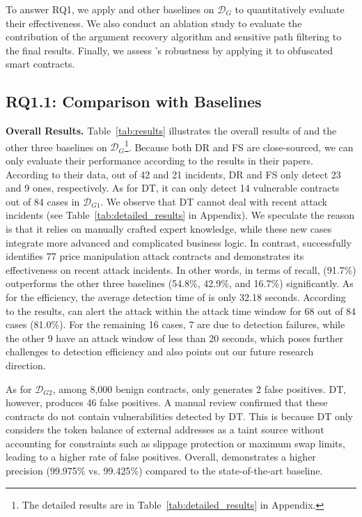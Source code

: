 To answer RQ1, we apply {\tool} and other baselines on $\mathcal{D}_G$ to quantitatively evaluate their effectiveness. We also conduct an ablation study to evaluate the contribution of the argument recovery algorithm and sensitive path filtering to the final results.
Finally, we assess {\tool}'s robustness by applying it to obfuscated smart contracts.

\subsection{RQ1.1: Comparison with Baselines}
\noindent 
\textbf{Overall Results.}
Table~\ref{tab:results} illustrates the overall results of {\tool} and the other three baselines on $\mathcal{D}_G$\footnote{The detailed results are in Table~\ref{tab:detailed_results} in Appendix.}.
Because both DR and FS are close-sourced, we can only evaluate their performance according to the results in their papers.
According to their data, out of 42 and 21 incidents, DR and FS only detect 23 and 9 ones, respectively.
As for DT, it can only detect 14 vulnerable contracts out of 84 cases in $\mathcal{D}_{G1}$. We observe that DT cannot deal with recent attack incidents (see Table~\ref{tab:detailed_results} in Appendix). We speculate the reason is that it relies on manually crafted expert knowledge, while these new cases integrate more advanced and complicated business logic.
In contrast, {\tool} successfully identifies 77 price manipulation attack contracts and demonstrates its effectiveness on recent attack incidents.
In other words, in terms of recall, {\tool} (91.7\%) outperforms the other three baselines (54.8\%, 42.9\%, and 16.7\%) significantly.
As for the efficiency, the average detection time of {\tool} is only 32.18 seconds. According to the results, {\tool} can alert the attack within the attack time window for 68 out of 84 cases (81.0\%). For the remaining 16 cases, 7 are due to detection failures, while the other 9 have an attack window of less than 20 seconds, which poses further challenges to detection efficiency and also points out our future research direction.

As for $\mathcal{D}_{G2}$, among 8,000 benign contracts, {\tool} only generates 2 false positives. DT, however, produces 46 false positives. A manual review confirmed that these contracts do not contain vulnerabilities detected by DT.
This is because DT only considers the token balance of external addresses as a taint source without accounting for constraints such as slippage protection or maximum swap limits, leading to a higher rate of false positives.
Overall, {\tool} demonstrates a higher precision (99.975\% vs. 99.425\%) compared to the state-of-the-art baseline.


